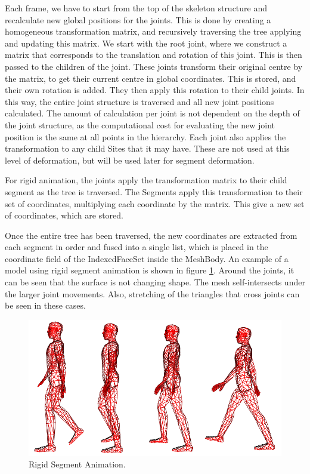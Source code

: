 \documentclass[10pt,oneside,fleqn,a4paper]{book}
\begin{document}
Each frame, we have to start from the top of the skeleton structure and recalculate new global positions for the joints. This is done by creating a homogeneous transformation matrix, and recursively traversing the tree applying and updating this matrix. We start with the root joint, where we construct a matrix that corresponds to the translation and rotation of this joint. This is then passed to the children of the joint. These joints transform their original centre by the matrix, to get their current centre in global coordinates. This is stored, and their own rotation is added. They then apply this rotation to their child joints. In this way, the entire joint structure is traversed and all new joint positions calculated. The amount of calculation per joint is not dependent on the depth of the joint structure, as the computational cost for evaluating the new joint position is the same at all points in the hierarchy. Each joint also applies the transformation to any child Sites that it may have. These are not used at this level of deformation, but will be used later for segment deformation.

For rigid animation, the joints apply the transformation matrix to their child segment as the tree is traversed. The Segments apply this transformation to their set of coordinates, multiplying each coordinate by the matrix. This give a new set of coordinates, which are stored. 

Once the entire tree has been traversed, the new coordinates are extracted from each segment in order and fused into a single list, which is placed in the coordinate field of the IndexedFaceSet inside the MeshBody. An example of a model using rigid segment animation is shown in figure \ref{fig:rigidsegments}. Around the joints, it can be seen that the surface is not changing shape. The mesh self-intersects under the larger joint movements. Also, stretching of the triangles that cross joints can be seen in these cases.

\begin{figure}
\begin{center}
\includegraphics[width=14cm]{../images/rigidanimation}
\caption[Rigid Segment Animation]{\label{fig:rigidsegments} Rigid Segment Animation.}
\end{center}
\end{figure}
\end{document}

